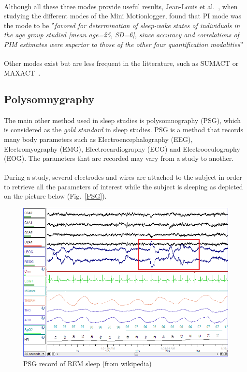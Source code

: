 \documentclass[a4paper,12pt]{article}
\begin{document}
\paragraph{}
Although all these three modes provide useful results, Jean-Louis et al.~\cite{Jean-Louis2001}, when studying the different modes of the Mini Motionlogger, found that PI mode was the mode to be ''\textit{favored for determination of sleep-wake states of individuals in the age group studied [mean age=25, SD=6], since accuracy and correlations of PIM estimates were superior to those of the other four quantification modalities}''\cite{Jean-Louis2001}

\paragraph{}
Other modes exist but are less frequent in the litterature, such as SUMACT or MAXACT~\cite{Jean-Louis2001}.

\subsection{Polysomnygraphy}

\paragraph{}
The main other method used in sleep studies is polysomnography (PSG), which is considered as the \textit{gold standard} in sleep studies. PSG is a method that records many body parameters such as Electroencephalography (EEG), Electromyography (EMG), Electrocardiography (ECG) and Electrooculography (EOG). The parameters that are recorded may vary from a study to another.

\paragraph{}
During a study, several electrodes and wires are attached to the subject in order to retrieve all the parameters of interest while the subject is sleeping as depicted on the picture below (Fig.~\ref{PSG}).

\begin{figure}[H]
\centering
\includegraphics[scale=0.4]{Images/PSG.png}
\caption{PSG record of REM sleep (from wikipedia)}
\end{figure}
\end{document}
